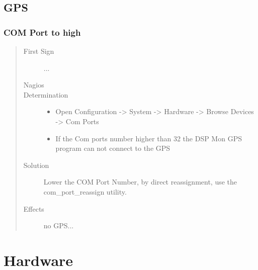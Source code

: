 \documentclass[a4paper,11pt,english]{sphinxmanual}
\begin{document}
\section{GPS}
\label{known-issues:gps}

\subsection{COM Port to high}
\label{known-issues:com-port-to-high}\begin{quote}\begin{description}
\item[{First Sign}] \leavevmode
...

\item[{Nagios}] \leavevmode
\item[{Determination}] \leavevmode\begin{itemize}
\item {} 
Open Configuration -\textgreater{} System -\textgreater{} Hardware -\textgreater{} Browse Devices -\textgreater{} Com Ports

\item {} 
If the Com ports number higher than 32 the DSP Mon GPS program can not connect to the GPS

\end{itemize}

\item[{Solution}] \leavevmode
Lower the COM Port Number, by direct reassignment, use the com\_port\_reassign utility.

\item[{Effects}] \leavevmode
no GPS...

\end{description}\end{quote}


\chapter{Hardware}
\label{known-issues:hardware}


\renewcommand{\indexname}{Index}
\printindex
\end{document}
